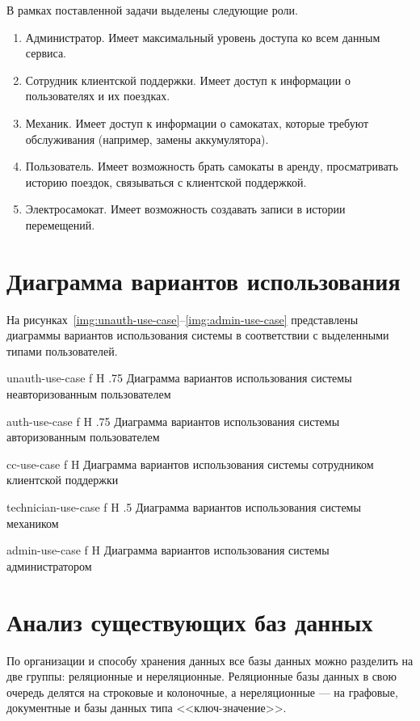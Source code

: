 В рамках поставленной задачи выделены следующие роли.

\begin{enumerate}
    \item Администратор. Имеет максимальный уровень доступа ко всем данным сервиса.
    \item Сотрудник клиентской поддержки. Имеет доступ к информации о пользователях и их поездках.
    \item Механик. Имеет доступ к информации о самокатах, которые требуют обслуживания (например, замены аккумулятора).
    \item Пользователь. Имеет возможность брать самокаты в аренду, просматривать историю поездок, связываться с клиентской поддержкой.
    \item Электросамокат. Имеет возможность создавать записи в истории перемещений.
\end{enumerate}

\section{Диаграмма вариантов использования}

На рисунках~\ref{img:unauth-use-case}--\ref{img:admin-use-case} представлены диаграммы вариантов использования системы в соответствии с выделенными типами пользователей.

    {unauth-use-case}
    {f}
    {H}
    {.75\textwidth}
    {Диаграмма вариантов использования системы неавторизованным пользователем}

    {auth-use-case}
    {f}
    {H}
    {.75\textwidth}
    {Диаграмма вариантов использования системы авторизованным пользователем}

    {cc-use-case}
    {f}
    {H}
    {\textwidth}
    {Диаграмма вариантов использования системы сотрудником клиентской поддержки}

    {technician-use-case}
    {f}
    {H}
    {.5\textwidth}
    {Диаграмма вариантов использования системы механиком}

    {admin-use-case}
    {f}
    {H}
    {\textwidth}
    {Диаграмма вариантов использования системы администратором}

\section{Анализ существующих баз данных}

По организации и способу хранения данных все базы данных можно разделить на две группы: реляционные и нереляционные. Реляционные базы данных в свою очередь делятся на строковые и колоночные, а нереляционные --- на графовые, документные и базы данных типа <<ключ-значение>>.

